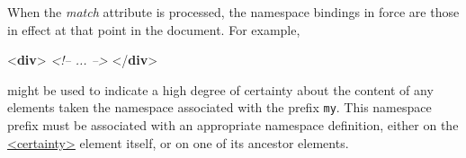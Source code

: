 When the {\itshape match} attribute is processed, the namespace bindings in force are those in effect at that point in the document. For example, \par\bgroup{}\exampleFont \begin{shaded}\noindent\mbox{}{<\textbf{div}>}\mbox{}\newline 
\textit{<!-- ... -->}\mbox{}\newline 
{}\mbox{}\newline 
{</\textbf{div}>}\end{shaded}\egroup\par \noindent  might be used to indicate a high degree of certainty about the content of any elements taken the namespace associated with the prefix \texttt{my}. This namespace prefix must be associated with an appropriate namespace definition, either on the \hyperref[TEI.certainty]{<certainty>} element itself, or on one of its ancestor elements.
